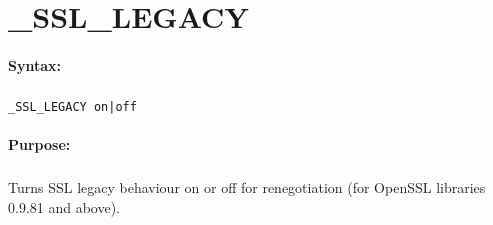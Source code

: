 
\newpage
\section{\_SSL\_LEGACY}
\label{cmd:_SSL_LEGACY}

\paragraph{Syntax:}
\subparagraph{}
\texttt{\_SSL\_LEGACY on|off}

\paragraph{Purpose:}
\subparagraph{}
Turns SSL legacy behaviour on or off for renegotiation (for 
OpenSSL libraries 0.9.81 and above).

